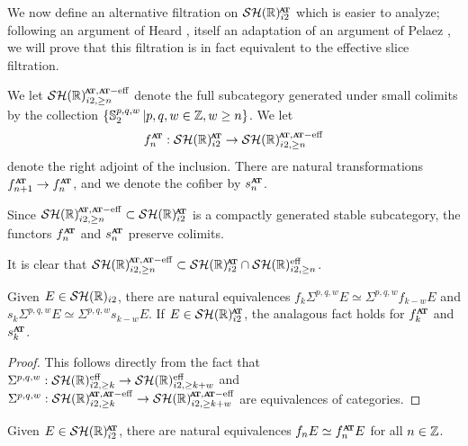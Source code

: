We now define an alternative filtration on $\SHRat$ which is easier to analyze; following an argument of Heard \cite{SliceComp}, itself an adaptation of an argument of Pelaez \cite{Pelaez}, we will prove that this filtration is in fact equivalent to the effective slice filtration.

\begin{dfn}
  We let $\SHR^{\at, \gceff} _{i2, \geq n}$ denote the full subcategory generated under small colimits by the collection $\{\operatorname{\mathbb{S}}_{2} ^{p,q,w} \vert p,q,w \in \mathbb{Z}, w \geq n\}$.
  We let
  \[ f_n ^{\att} : \SHRat \to \SHR^{\at, \gceff}_{i2, \geq n} \]
  denote the right adjoint of the inclusion. There are natural transformations $f_{n+1} ^{\att} \to f_{n} ^{\att}$, and we denote the cofiber by $s_n ^{\att}$.

  Since $\SHR^{\at, \gceff}_{i2, \geq n} \subset \SHRat$ is a compactly generated stable subcategory, the functors $f_n ^{\att}$ and $s_n ^{\att}$ preserve colimits.
\end{dfn}

It is clear that $\SHR^{\at,\gceff} _{i2, \geq n} \subset \SHRat \cap \SHR^{\eff} _{i2, \geq n}$.
%

\begin{lem} \label{lem:susp-slice}
  Given $E \in \mathcal{SH}(\mathbb{R})_{i2}$, there are natural equivalences $f_k \Sigma^{p,q,w} E \simeq \Sigma^{p,q,w} f_{k-w} E$ and $s_k \Sigma^{p,q,w} E \simeq \Sigma^{p,q,w} s_{k-w} E$.
  If $E \in \SHRat$, the analagous fact holds for $f_k ^{\att}$ and $s_k ^{\att}$.
\end{lem}

\begin{proof}
  This follows directly from the fact that $\Sigma^{p,q,w} : \mathcal{SH}(\mathbb{R})^{\mathrm{eff}} _{i2, \geq k} \to \mathcal{SH}(\mathbb{R})^{\mathrm{eff}}_{i2, \geq k +w}$ and $\Sigma^{p,q,w} : \SHR^{\at, \gceff} _{i2, \geq k} \to \SHR^{\at, \gceff}_{i2, \geq k +w}$ are equivalences of categories.
\end{proof}

\begin{lem} \label{prop:eff-slice-at-compare}
  Given  $E \in \SHRat$, there are natural equivalences $f_n E \simeq f_n ^{\att} E$ for all $n \in \mathbb{Z}$.
\end{lem}

